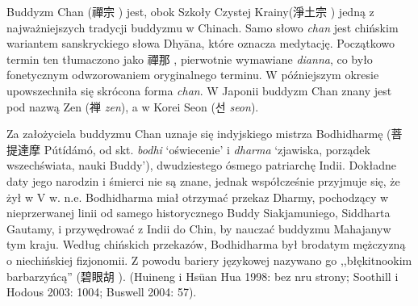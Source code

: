 \introduction
Buddyzm Chan (禪宗 ) jest, obok Szkoły Czystej Krainy\fnm (淨土宗 ) jedną z najważniejszych tradycji buddyzmu w Chinach. Samo słowo \textit{chan} jest chińskim wariantem %
sanskryckiego słowa Dhyāna, które oznacza medytację. %
Początkowo termin ten tłumaczono jako 禪那 , pierwotnie wymawiane \textit{dianna}, co było fonetycznym odwzorowaniem oryginalnego terminu. W późniejszym okresie upowszechniła się skrócona forma \textit{chan}. W Japonii buddyzm Chan znany jest pod nazwą Zen (禅 \textit{zen}), a w Korei Seon ({\Korean 선} \textit{seon}).
%

Za założyciela buddyzmu Chan uznaje się indyjskiego mistrza Bodhidharmę (菩提達摩 Pútídámó, od skt. \textit{bodhi} `oświecenie' i \textit{dharma} `zjawiska, porządek wszechświata, nauki Buddy'), dwudziestego ósmego patriarchę Indii. Dokładne daty jego narodzin i śmierci nie są znane, jednak współcześnie przyjmuje się, że żył w V w. n.e. Bodhidharma miał otrzymać przekaz Dharmy, pochodzący w nieprzerwanej linii od samego historycznego Buddy Siakjamuniego, Siddharta Gautamy, i przywędrować z Indii do Chin, by nauczać buddyzmu Mahajany\fnm w tym kraju. Według chińskich przekazów, Bodhidharma był brodatym mężczyzną o niechińskiej fizjonomii. Z powodu bariery językowej nazywano go ,,błękitnookim barbarzyńcą'' (碧眼胡 ). (Huineng i Hsüan Hua 1998: bez nru strony; Soothill i Hodous 2003: 1004; Buswell 2004: 57).
%

